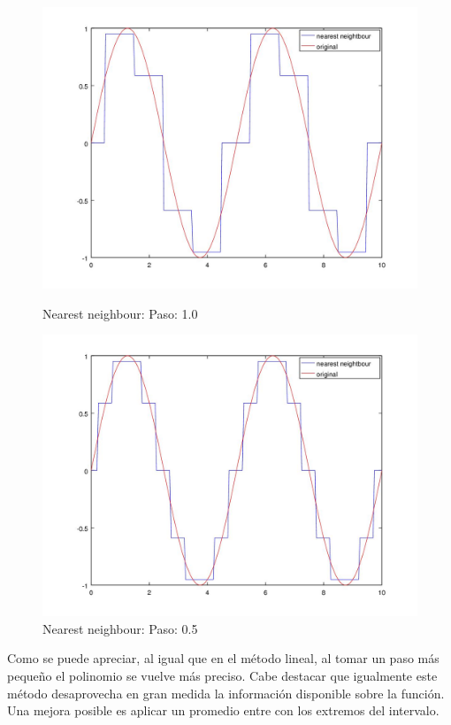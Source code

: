 \begin{figure}[h]
  \begin{minipage}[b]{.5\textwidth}
    \includegraphics[width=\textwidth]{complementos/nearest_1.jpg}
    \caption{Nearest neighbour: Paso: 1.0}
  \end{minipage}
  \begin{minipage}[b]{.5\textwidth}
    \includegraphics[width=\textwidth]{complementos/nearest_05.jpg}
    \caption{Nearest neighbour: Paso: 0.5}
  \end{minipage}
\end{figure}

Como se puede apreciar, al igual que en el método lineal, al tomar un paso más pequeño el polinomio se vuelve más preciso. Cabe destacar que igualmente este método desaprovecha en gran medida la información disponible sobre la función. Una mejora posible es aplicar un promedio entre con los extremos del intervalo.


